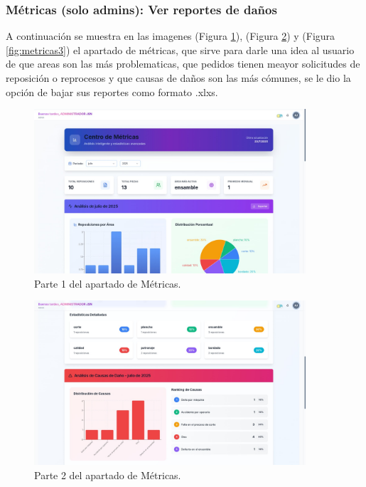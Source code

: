 \documentclass[12pt,letterpaper,spanish]{report}
\begin{document}
\subsubsection{Métricas (solo admins): Ver reportes de daños}
A continuación se muestra en las imagenes (Figura \ref{fig:metricas1}), (Figura \ref{fig:metricas2}) y (Figura \ref{fig:metricas3}) el apartado de métricas, que sirve para darle una idea al usuario de que areas son las más problematicas, que pedidos tienen meayor solicitudes de reposición o reprocesos y que causas de daños son las más cómunes, se le dio la opción de bajar sus reportes como formato .xlxs.

\begin{figure}[H]
    \centering
    \includegraphics[width=0.9\textwidth]{metricas1.jpg}
    \caption{Parte 1 del apartado de Métricas.}
    \label{fig:metricas1}
\end{figure}
\begin{figure}[H]
    \centering
    \includegraphics[width=0.9\textwidth]{metricas2.jpg}
    \caption{Parte 2 del apartado de Métricas.}
    \label{fig:metricas2}
\end{figure}
\end{document}
